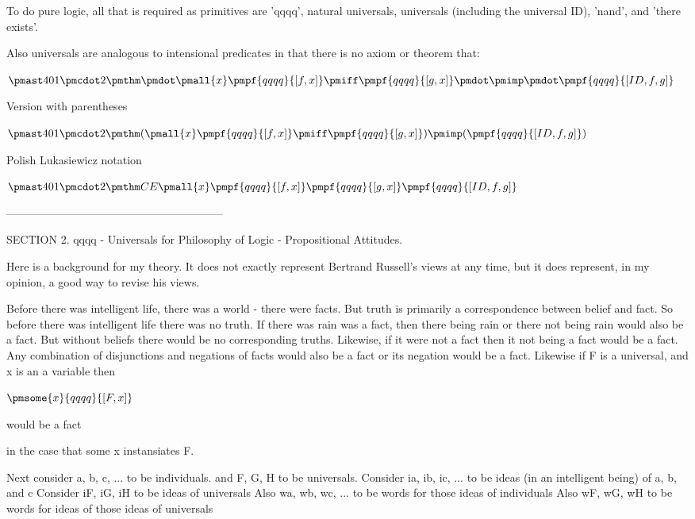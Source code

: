 \documentclass[12pt]{article}
\begin{document}
To do pure logic, all that is required as primitives are 'qqqq', natural universals, universals (including the universal ID), 'nand', and 'there exists'.  

Also universals are analogous to intensional predicates in that there is no axiom or theorem that:

$\pmast 401 \pmcdot 2 \pmthm \pmdot \pmall{x} \pmpf{qqqq}{[f, x]} \pmiff \pmpf{qqqq}{[g, x]} \pmdot \pmimp \pmdot \pmpf{qqqq}{[ID, f, g]} $
 
 

Version with parentheses

$\pmast 401 \pmcdot 2 \pmthm  (  \pmall{x}\pmpf{qqqq}{[f, x]} \pmiff \pmpf{qqqq}{[g, x]}  ) \pmimp (  \pmpf{qqqq}{[ID, f, g]} )$


Polish Lukasiewicz notation

$\pmast 401 \pmcdot 2 \pmthm  C    E   \pmall{x}\pmpf{qqqq}{[f,   x]}   \pmpf{qqqq}{[g,   x]}    \pmpf{qqqq}{[ID,   f,   g]}  $


-----------------------------------------------------------

SECTION 2. qqqq - Universals for Philosophy of Logic - Propositional Attitudes.

Here is a background for my theory. It does not exactly
represent Bertrand Russell's views at any time, but it
does represent, in my opinion, a good way to revise
his views.

Before there was intelligent life, there was a world - there were facts.
But truth is primarily a correspondence between belief and fact.
So before there was intelligent life there was no truth.
If there was rain was a fact, then there being rain or there not
being rain would also be a fact. But without beliefs there would be
no corresponding truths.
Likewise, if it were not a fact then it not being a fact would be a fact.
Any combination of disjunctions and negations of facts would also
be a fact or its negation would be a fact.
Likewise if F is a universal, and x is an a variable then

$\pmsome{x}{qqqq}{[F,x]}$

would be a fact

in the case that some x instansiates F.

Next consider a, b, c, ... to be individuals.
and F, G, H to be universals. 
Consider ia, ib, ic, ... to be ideas (in an intelligent being) of a, b, and c
Consider iF, iG, iH to be ideas of universals
Also wa, wb, wc, ... to be words for those ideas of individuals
Also wF, wG, wH to be words for ideas of those ideas of universals
\end{document}
